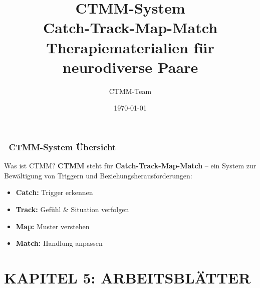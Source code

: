 \documentclass[a4paper,12pt]{article} %
\begin{document}
\title{%
  {\Huge\textcolor{ctmmBlue}{CTMM-System}}\\
  \vspace{0.5cm}
  {\Large\textcolor{ctmmOrange}{Catch-Track-Map-Match}}\\
  \vspace{0.5cm}
  {\normalsize\textcolor{ctmmGreen}{Therapiematerialien für neurodiverse Paare}}
}
\author{CTMM-Team}
\date{\today}
\maketitle

\tableofcontents
\newpage

\section*{\texorpdfstring{\textcolor{ctmmBlue}{\faCompass~CTMM-System Übersicht}}{CTMM-System Übersicht}}

\begin{ctmmBlueBox}{Was ist CTMM?}
\textbf{CTMM} steht für \textbf{Catch-Track-Map-Match} -- ein System zur Bewältigung von Triggern und Beziehungsherausforderungen:

\begin{itemize}
  \item \textcolor{ctmmBlue}{\textbf{Catch:}} Trigger erkennen
  \item \textcolor{ctmmGreen}{\textbf{Track:}} Gefühl \& Situation verfolgen
  \item \textcolor{ctmmOrange}{\textbf{Map:}} Muster verstehen
  \item \textcolor{ctmmPurple}{\textbf{Match:}} Handlung anpassen
\end{itemize}
\end{ctmmBlueBox}

















\newpage
\part*{KAPITEL 5: ARBEITSBLÄTTER}












\end{document}
